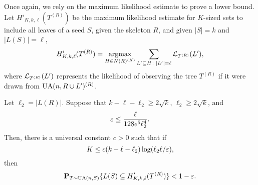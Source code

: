 Once again, we rely on the maximum likelihood estimate to prove a
lower bound. Let $H'_{K, k, \ell}(T^{(R)})$ be the maximum likelihood
estimate for $K$-sized sets to include all leaves of a seed $S$, given
the skeleton $R$, and given $|S| = k$ and $|L(S)| = \ell$, \ie
\[
  H'_{K, k, \ell}(T^{(R)}) = \operatorname*{argmax}_{H \in N(R)^{(K)}} \sum_{L' \subseteq H \colon |L'| = \ell}
  \mathcal{L}_{T^{(R)}}(L') ,
\]
where $\mathcal{L}_{T^{(R)}}(L')$ represents the likelihood of observing the
tree $T^{(R)}$ if it were drawn from $\operatorname{UA}(n, R \cup L')^{(R)}$.
\begin{prop}
  Let $\ell_2 = |L(R)|$. Suppose that
  $k - \ell - \ell_2 \ge 2 \sqrt{k}$, $\ell_2 \ge 2 \sqrt{k}$, and
  \[
    \varepsilon \le \frac{\ell}{128 e^5 \ell_2^4} .
  \]
  Then, there is a universal constant $c > 0$ such that if
  \[
    K \le  c (k - \ell - \ell_2) \log (\ell_2 \ell/\varepsilon) ,
  \]
  then
  \[
    \operatorname{\mathbf{P}}_{T \sim \operatorname{UA}(n, S)}\{L(S) \subseteq H'_{K, k, \ell}(T^{(R)})\}
    < 1 - \varepsilon .
  \]
\end{prop}
